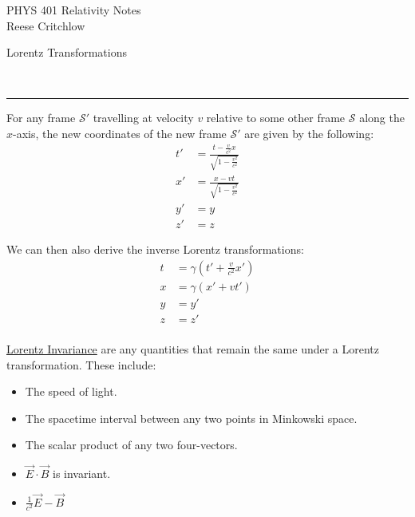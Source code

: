 \documentclass{article}
\newcommand{\header}[1]{\begin{large}\noindent #1\end{large}\\\rule{\textwidth}{0.5pt}}
\begin{document}
\begin{center}
        \Large PHYS 401 Relativity Notes\\
        \normalsize Reese Critchlow
\end{center}

\header{Lorentz Transformations}

For any frame $\mathcal{S}'$ travelling at velocity $v$ relative to some other
frame $\mathcal{S}$ along the $x$-axis, the new coordinates of the new frame $\mathcal{S}'$
are given by the following:
\begin{align*}
    t' &= \frac{t- \frac{v}{c^2}x}{\sqrt{1- \frac{v^2}{c^2}}}\\
    x' &= \frac{x- vt}{\sqrt{1 - \frac{v^2}{c^2}}}\\
    y' &= y\\
    z' &= z
\end{align*}

We can then also derive the inverse Lorentz transformations:
\begin{align*}
    t &= \gamma \left(t' + \frac{v}{c^2} x'\right)\\
    x &= \gamma (x' + vt')\\
    y &= y'\\
    z &= z'\\
\end{align*}

\underline{Lorentz Invariance} are any quantities that remain the same under a Lorentz transformation. These include:
\begin{itemize}
    \item The speed of light.
    \item The spacetime interval between any two points in Minkowski space.
    \item The scalar product of any two four-vectors.
    \item $\vec{E} \cdot \vec{B}$ is invariant.
    \item $\frac{1}{c^2}\vec{E} - \vec{B}$
\end{itemize}
\end{document}

